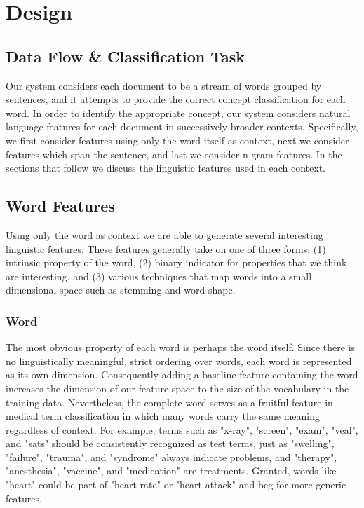 \documentclass[preprint]{style}
\begin{document}
\section{Design}

\subsection{Data Flow \& Classification Task}
Our system considers each document to be a stream of words grouped by sentences, and it attempts to provide the correct concept classification for each word. In order to identify the appropriate concept, our system considers natural language features for each document in successively broader contexts. Specifically, we first consider features using only the word itself as context, next we consider features which span the sentence, and last we consider n-gram features. In the sections that follow we discuss the linguistic features used in each context.

\subsection{Word Features}
Using only the word as context we are able to generate several interesting linguistic features. These features generally take on one of three forms: (1) intrinsic property of the word, (2) binary indicator for properties that we think are interesting, and (3) various techniques that map words into a small dimensional space such as stemming and word shape.

\subsubsection{Word}
The most obvious property of each word is perhaps the word itself. Since there is no linguistically meaningful, strict ordering over words, each word is represented as its own dimension. Consequently adding a baseline feature containing the word increases the dimension of our feature space to the size of the vocabulary in the training data. Nevertheless, the complete word serves as a fruitful feature in medical term classification in which many words carry the same meaning regardless of context. For example, terms such as "x-ray", "screen", "exam", "veal", and "sats" should be consistently recognized as test terms, just as "swelling", "failure", "trauma", and "syndrome" always indicate problems, and "therapy", "anesthesia", "vaccine", and "medication" are treatments. Granted, words like "heart" could be part of "heart rate" or "heart attack" and beg for more generic features.
\end{document}
